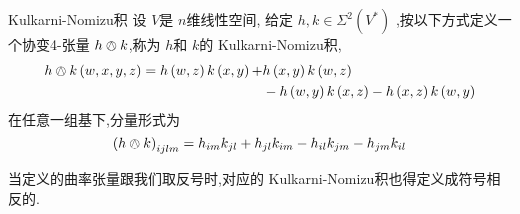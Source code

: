 \documentclass[../../几何与拓扑.tex]{subfiles}
\begin{document}
\begin{definition}{Kulkarni-Nomizu积}
    设 \(  V  \)是 \(  n  \)维线性空间,  给定 \(  h,k \in  \Sigma ^{2}\left( V^{*} \right)   \) ,按以下方式定义一个协变4-张量 \(  h\owedge k  \),称为 \(  h  \)和 \(  k  \)的 Kulkarni-Nomizu积, \[
    \begin{aligned}
    h\owedge k\left( w,x,y,z \right)= h\left( w,z \right)k\left( x,y \right)+& h\left( x,y \right)k\left( w,z \right) \\ 
     &-h\left( w,y \right)k\left( x,z \right)-h\left( x,z \right)k\left( w,y \right)         
    \end{aligned}
    \]   在任意一组基下,分量形式为 \[
    \left( h\owedge k \right)_{ijlm}= h_{im}k_{jl}+ h_{jl}k_{im}-h_{il}k_{jm}-h_{jm}k_{il} 
    \]
\end{definition}
\begin{remark}
    当定义的曲率张量跟我们取反号时,对应的 Kulkarni-Nomizu积也得定义成符号相反的.
\end{remark}
\end{document}

